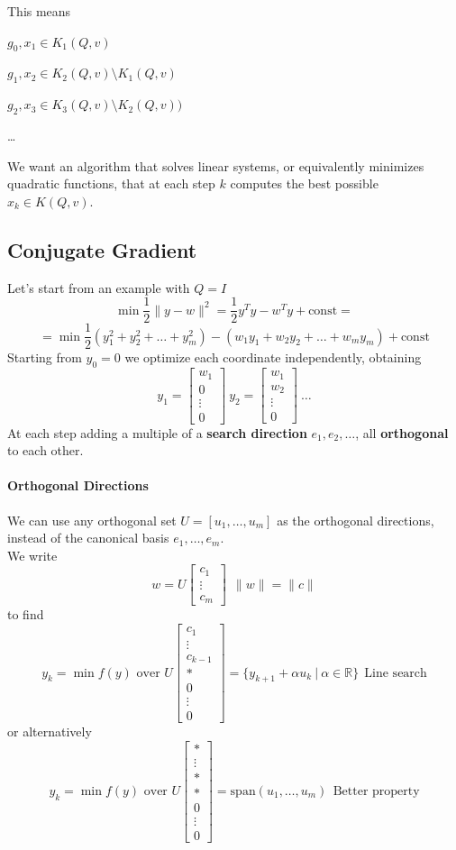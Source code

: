 \documentclass[10pt]{report}
\begin{document}
This means\begin{list}{}{}
	\item $g_0, x_1\in K_1(Q,v)$
	\item $g_1, x_2\in K_2(Q,v)\setminus K_1(Q,v)$
	\item $g_2, x_3\in K_3(Q,v)\setminus K_2(Q,v))$
	\item \ldots
\end{list}
We want an algorithm that solves linear systems, or equivalently minimizes quadratic functions, that at each step $k$ computes the best possible $x_k\in K(Q,v)$.
\subsection{Conjugate Gradient}
Let's start from an example with $Q=I$
$$\min\frac{1}{2}\|y-w\|^2=\frac{1}{2}y^Ty-w^Ty+\text{const}=$$
$$=\min\frac{1}{2}(y_1^2+y_2^2+\ldots+y_m^2) - (w_1y_1+w_2y_2+\ldots+w_my_m)+\text{const}$$
Starting from $y_0=0$ we optimize each coordinate independently, obtaining
$$y_1=\left[\begin{array}{c}
w_1\\0\\\vdots\\0
\end{array}\right]\:y_2=\left[\begin{array}{c}
w_1\\w_2\\\vdots\\0
\end{array}\right]\:\ldots$$
At each step adding a multiple of a \textbf{search direction} $e_1,e_2,\ldots$, all \textbf{orthogonal} to each other.
\paragraph{Orthogonal Directions} We can use any orthogonal set $U=[u_1,\ldots,u_m]$ as the orthogonal directions, instead of the canonical basis $e_1,\ldots,e_m$.\\
We write $$w=U\left[\begin{array}{c}
c_1\\\vdots\\c_m
\end{array}\right]\:\:\|w\|=\|c\|$$
to find $$y_k=\min f(y)\text{ over }U\left[\begin{array}{c}
c_1\\\vdots\\c_{k-1}\\\text{*}\\0\\\vdots\\0
\end{array}\right]=\{y_{k+1} + \alpha u_k\:|\:\alpha\in\mathbb{R}\}\:\:\text{Line search}$$
or alternatively $$y_k=\min f(y)\text{ over }U\left[\begin{array}{c}
\text{*}\\\vdots\\\text{*}\\\text{*}\\0\\\vdots\\0
\end{array}\right]=\text{span}(u_1,\ldots,u_m)\:\:\text{Better property}$$
\end{document}
